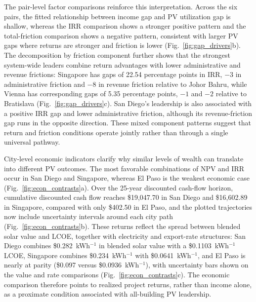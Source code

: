 \documentclass[pdflatex,sn-nature]{sn-jnl}
\begin{document}
The pair-level factor comparisons reinforce this interpretation. Across the six pairs, the fitted relationship between income gap and PV utilization gap is shallow, whereas the IRR comparison shows a stronger positive pattern and the total-friction comparison shows a negative pattern, consistent with larger PV gaps where returns are stronger and friction is lower (Fig.~\ref{fig:gap_drivers}b). The decomposition by friction component further shows that the strongest system-wide leaders combine return advantages with lower administrative and revenue frictions: Singapore has gaps of 22.54 percentage points in IRR, $-3$ in administrative friction and $-8$ in revenue friction relative to Johor Bahru, while Vienna has corresponding gaps of 5.35 percentage points, $-1$ and $-2$ relative to Bratislava (Fig.~\ref{fig:gap_drivers}c). San Diego's leadership is also associated with a positive IRR gap and lower administrative friction, although its revenue-friction gap runs in the opposite direction. These mixed component patterns suggest that return and friction conditions operate jointly rather than through a single universal pathway.

City-level economic indicators clarify why similar levels of wealth can translate into different PV outcomes. The most favorable combinations of NPV and IRR occur in San Diego and Singapore, whereas El Paso is the weakest economic case (Fig.~\ref{fig:econ_contrasts}a). Over the 25-year discounted cash-flow horizon, cumulative discounted cash flow reaches \$19,047.70 in San Diego and \$16,602.89 in Singapore, compared with only \$402.50 in El Paso, and the plotted trajectories now include uncertainty intervals around each city path (Fig.~\ref{fig:econ_contrasts}b). These returns reflect the spread between blended solar value and LCOE, together with electricity and export-rate structures: San Diego combines \$0.282~kWh$^{-1}$ in blended solar value with a \$0.1103~kWh$^{-1}$ LCOE, Singapore combines \$0.234~kWh$^{-1}$ with \$0.0641~kWh$^{-1}$, and El Paso is nearly at parity (\$0.097 versus \$0.0936~kWh$^{-1}$), with uncertainty bars shown on the value and rate comparisons (Fig.~\ref{fig:econ_contrasts}c). The economic comparison therefore points to realized project returns, rather than income alone, as a proximate condition associated with all-building PV leadership.
\end{document}
